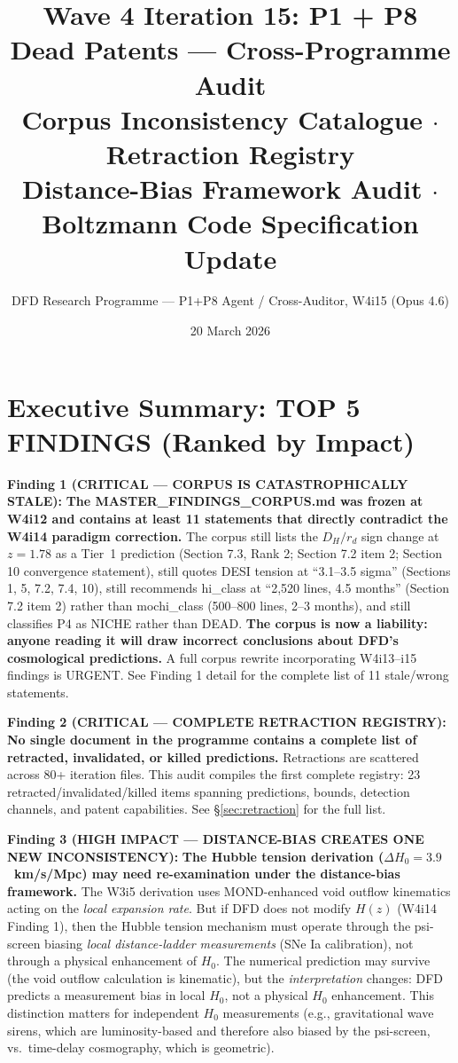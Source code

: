 \documentclass[11pt]{article}
\title{\textbf{Wave 4 Iteration 15: P1 + P8 Dead Patents --- Cross-Programme Audit}\\[0.5em]
\large Corpus Inconsistency Catalogue $\cdot$ Retraction Registry\\
Distance-Bias Framework Audit $\cdot$ Boltzmann Code Specification Update}
\author{DFD Research Programme --- P1+P8 Agent / Cross-Auditor, W4i15 (Opus 4.6)}
\date{20 March 2026}
\begin{document}
\maketitle


\section*{Executive Summary: TOP 5 FINDINGS (Ranked by Impact)}

\begin{tcolorbox}[colback=red!5!white, colframe=red!60!black,
  title=\textbf{TOP 5 FINDINGS --- W4i15}]

\textbf{Finding 1 (CRITICAL --- CORPUS IS CATASTROPHICALLY STALE):}
\textbf{The MASTER\_FINDINGS\_CORPUS.md was frozen at W4i12 and contains
at least 11 statements that directly contradict the W4i14 paradigm
correction.}  The corpus still lists the $D_H/r_d$ sign change at
$z = 1.78$ as a Tier~1 prediction (Section 7.3, Rank 2; Section 7.2
item 2; Section 10 convergence statement), still quotes DESI tension
at ``3.1--3.5 sigma'' (Sections 1, 5, 7.2, 7.4, 10), still recommends
hi\_class at ``2,520 lines, 4.5 months'' (Section 7.2 item 2) rather
than mochi\_class (500--800 lines, 2--3 months), and still classifies
P4 as NICHE rather than DEAD.  \textbf{The corpus is now a liability:
anyone reading it will draw incorrect conclusions about DFD's
cosmological predictions.}  A full corpus rewrite incorporating W4i13--i15
findings is URGENT.  See Finding 1 detail for the complete list of
11 stale/wrong statements.

\textbf{Finding 2 (CRITICAL --- COMPLETE RETRACTION REGISTRY):}
\textbf{No single document in the programme contains a complete list of
retracted, invalidated, or killed predictions.}  Retractions are scattered
across 80+ iteration files.  This audit compiles the first complete
registry: 23 retracted/invalidated/killed items spanning predictions,
bounds, detection channels, and patent capabilities.  See
\S\ref{sec:retraction} for the full list.

\textbf{Finding 3 (HIGH IMPACT --- DISTANCE-BIAS CREATES ONE NEW
INCONSISTENCY):}
\textbf{The Hubble tension derivation ($\Delta H_0 = 3.9$~km/s/Mpc) may
need re-examination under the distance-bias framework.}  The W3i5
derivation uses MOND-enhanced void outflow kinematics acting on the
\emph{local expansion rate}.  But if DFD does not modify $H(z)$
(W4i14 Finding 1), then the Hubble tension mechanism must operate
through the psi-screen biasing \emph{local distance-ladder measurements}
(SNe Ia calibration), not through a physical enhancement of $H_0$.
The numerical prediction may survive (the void outflow calculation
is kinematic), but the \emph{interpretation} changes: DFD predicts a
measurement bias in local $H_0$, not a physical $H_0$ enhancement.
This distinction matters for independent $H_0$ measurements
(e.g., gravitational wave sirens, which are luminosity-based and
therefore also biased by the psi-screen, vs.\ time-delay cosmography,
which is geometric).


\end{tcolorbox}
\end{document}
